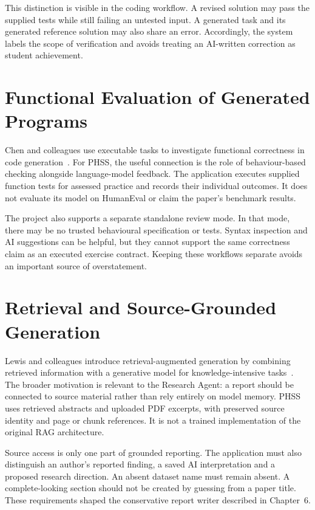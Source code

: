 This distinction is visible in the coding workflow. A revised solution may pass the supplied tests while still failing an untested input. A generated task and its generated reference solution may also share an error. Accordingly, the system labels the scope of verification and avoids treating an AI-written correction as student achievement.

\section{Functional Evaluation of Generated Programs}
Chen and colleagues use executable tasks to investigate functional correctness in code generation~\cite{chen2021}. For PHSS, the useful connection is the role of behaviour-based checking alongside language-model feedback. The application executes supplied function tests for assessed practice and records their individual outcomes. It does not evaluate its model on HumanEval or claim the paper's benchmark results.

The project also supports a separate standalone review mode. In that mode, there may be no trusted behavioural specification or tests. Syntax inspection and AI suggestions can be helpful, but they cannot support the same correctness claim as an executed exercise contract. Keeping these workflows separate avoids an important source of overstatement.

\section{Retrieval and Source-Grounded Generation}
Lewis and colleagues introduce retrieval-augmented generation by combining retrieved information with a generative model for knowledge-intensive tasks~\cite{lewis2020}. The broader motivation is relevant to the Research Agent: a report should be connected to source material rather than rely entirely on model memory. PHSS uses retrieved abstracts and uploaded PDF excerpts, with preserved source identity and page or chunk references. It is not a trained implementation of the original RAG architecture.

Source access is only one part of grounded reporting. The application must also distinguish an author's reported finding, a saved AI interpretation and a proposed research direction. An absent dataset name must remain absent. A complete-looking section should not be created by guessing from a paper title. These requirements shaped the conservative report writer described in Chapter~6.

